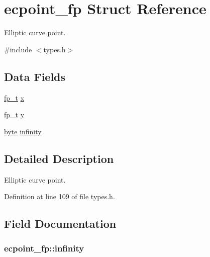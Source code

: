 \hypertarget{structecpoint__fp}{\section{ecpoint\-\_\-fp Struct Reference}
\label{structecpoint__fp}
}


Elliptic curve point.  




{\ttfamily \#include $<$types.\-h$>$}

\subsection*{Data Fields}
\begin{DoxyCompactItemize}
\item 
\hyperlink{types_8h_a394d4948fdab003e7d47d78d73f8a64f}{fp\-\_\-t} \hyperlink{structecpoint__fp_a5d560562bc26a70f40189ad902070f28}{x}
\item 
\hyperlink{types_8h_a394d4948fdab003e7d47d78d73f8a64f}{fp\-\_\-t} \hyperlink{structecpoint__fp_a099711871e8206f551c4f1bfb8fa2903}{y}
\item 
\hyperlink{types_8h_a0c8186d9b9b7880309c27230bbb5e69d}{byte} \hyperlink{structecpoint__fp_acefba4b31d19eea20fa8a6779e6a0d7a}{infinity}
\end{DoxyCompactItemize}


\subsection{Detailed Description}
Elliptic curve point. 



Definition at line 109 of file types.\-h.



\subsection{Field Documentation}
\hypertarget{structecpoint__fp_acefba4b31d19eea20fa8a6779e6a0d7a}{
\subsubsection[{infinity}]{ ecpoint\-\_\-fp\-::infinity}}\label{structecpoint__fp_acefba4b31d19eea20fa8a6779e6a0d7a}


